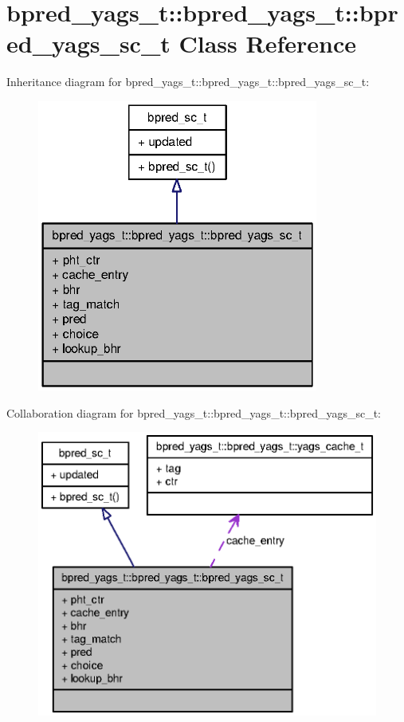 \section{bpred\_\-yags\_\-t::bpred\_\-yags\_\-t::bpred\_\-yags\_\-sc\_\-t Class Reference}
\label{classbpred__yags__t_1_1bpred__yags__sc__t}
Inheritance diagram for bpred\_\-yags\_\-t::bpred\_\-yags\_\-t::bpred\_\-yags\_\-sc\_\-t:\nopagebreak
\begin{figure}[H]
\begin{center}
\leavevmode
\includegraphics[width=262pt]{classbpred__yags__t_1_1bpred__yags__sc__t__inherit__graph}
\end{center}
\end{figure}
Collaboration diagram for bpred\_\-yags\_\-t::bpred\_\-yags\_\-t::bpred\_\-yags\_\-sc\_\-t:\nopagebreak
\begin{figure}[H]
\begin{center}
\leavevmode
\includegraphics[width=346pt]{classbpred__yags__t_1_1bpred__yags__sc__t__coll__graph}
\end{center}
\end{figure}

